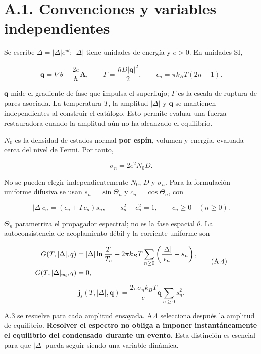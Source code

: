 \documentclass[
  spanish,
  10pt,
  a4paper,
]{article}
\begin{document}
\section{A.1. Convenciones y variables
independientes}\label{a.1.-convenciones-y-variables-independientes}

Se escribe \(\Delta=|\Delta|e^{i\theta}\); \(|\Delta|\) tiene unidades
de energía y \(e>0\). En unidades SI,

\[
\mathbf q=\nabla\theta-\frac{2e}{\hbar}\mathbf A,
\qquad \Gamma=\frac{\hbar D|\mathbf q|^2}{2},
\qquad \epsilon_n=\pi k_BT(2n+1).
\tag{A.1}
\]

\(\mathbf q\) mide el gradiente de fase que impulsa el superflujo;
\(\Gamma\) es la escala de ruptura de pares asociada. La temperatura
\(T\), la amplitud \(|\Delta|\) y \(\mathbf q\) se mantienen
independientes al construir el catálogo. Esto permite evaluar una fuerza
restauradora cuando la amplitud aún no ha alcanzado el equilibrio.

\(N_0\) es la densidad de estados normal \textbf{por espín}, volumen y
energía, evaluada cerca del nivel de Fermi. Por tanto,

\[
\sigma_n=2e^2N_0D.
\tag{A.2}
\]

No se pueden elegir independientemente \(N_0\), \(D\) y \(\sigma_n\).
Para la formulación uniforme difusiva se usan \(s_n=\sin\Theta_n\) y
\(c_n=\cos\Theta_n\), con

\[
|\Delta|c_n=(\epsilon_n+\Gamma c_n)s_n,
\qquad s_n^2+c_n^2=1,\qquad c_n\geq0\quad(n\geq0).
\tag{A.3}
\]

\(\Theta_n\) parametriza el propagador espectral; no es la fase espacial
\(\theta\). La autoconsistencia de acoplamiento débil y la corriente
uniforme son

\[
\begin{aligned}
G(T,|\Delta|,q)&=|\Delta|\ln\frac{T}{T_c}
+2\pi k_BT\sum_{n\geq0}\left(\frac{|\Delta|}{\epsilon_n}-s_n\right),\\
G(T,|\Delta|_{\rm eq},q)&=0,
\end{aligned}
\tag{A.4}
\]

\[
\mathbf j_s(T,|\Delta|,\mathbf q)
=\frac{2\pi\sigma_n k_BT}{e}\mathbf q\sum_{n\geq0}s_n^2.
\tag{A.5}
\]

A.3 se resuelve para cada amplitud ensayada. A.4 selecciona después la
amplitud de equilibrio. \textbf{Resolver el espectro no obliga a imponer
instantáneamente el equilibrio del condensado durante un evento.} Esta
distinción es esencial para que \(|\Delta|\) pueda seguir siendo una
variable dinámica.
\end{document}

